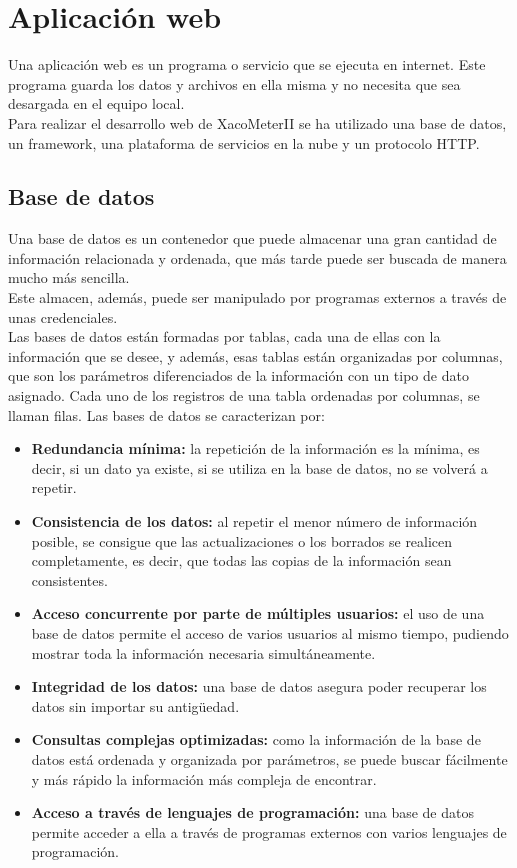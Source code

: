 \section{Aplicación web}
Una aplicación web es un programa o servicio que se ejecuta en internet. Este programa guarda los datos y archivos en ella misma y no necesita que sea desargada en el equipo local.\\
Para realizar el desarrollo web de XacoMeterII se ha utilizado una base de datos, un framework, una plataforma de servicios en la nube y un protocolo HTTP.
\subsection{Base de datos}
Una base de datos \cite{BD} es un contenedor que puede almacenar una gran cantidad de información relacionada y ordenada, que más tarde puede ser buscada de manera mucho más sencilla.\\
Este almacen, además, puede ser manipulado por programas externos a través de unas credenciales.\\
Las bases de datos están formadas por tablas, cada una de ellas con la información que se desee, y además, esas tablas están organizadas por columnas, que son los parámetros diferenciados de la información con un tipo de dato asignado.
Cada uno de los registros de una tabla ordenadas por columnas, se llaman filas.
Las bases de datos se caracterizan por:
\begin{itemize}
    \item \textbf{Redundancia mínima:} la repetición de la información es la mínima, es decir, si un dato ya existe, si se utiliza en la base de datos, no se volverá a repetir.
    \item \textbf{Consistencia de los datos:} al repetir el menor número de información posible, se consigue que las actualizaciones o los borrados se realicen completamente, es decir, que todas las copias de la información sean consistentes.
    \item \textbf{Acceso concurrente por parte de múltiples usuarios:} el uso de una base de datos permite el acceso de varios usuarios al mismo tiempo, pudiendo mostrar toda la información necesaria simultáneamente.
    \item \textbf{Integridad de los datos:} una base de datos asegura poder recuperar los datos sin importar su antigüedad.
    \item \textbf{Consultas complejas optimizadas:} como la información de la base de datos está ordenada y organizada por parámetros, se puede buscar fácilmente y más rápido la información más compleja de encontrar.
    \item \textbf{Acceso a través de lenguajes de programación:} una base de datos permite acceder a ella a través de programas externos con varios lenguajes de programación.
\end{itemize}   
